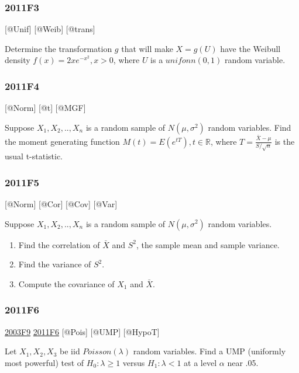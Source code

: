 \documentclass[6pt,Portrait]{article}
\begin{document}
\hypertarget{f3-4}{%
\subsubsection{2011F3}\label{f3-4}}

{[}@Unif{]} {[}@Weib{]} {[}@trans{]}

Determine the transformation \(g\) that will make \(X=g(U)\) have the
Weibull density \(f(x)=2xe^{-x^2},x>0\), where \(U\) is a
\(unifonn(0,1)\) random variable.

\hypertarget{f4-4}{%
\subsubsection{2011F4}\label{f4-4}}

{[}@Norm{]} {[}@t{]} {[}@MGF{]}

Suppose \(X_1,X_2,..,X_{n}\) is a random sample of \(N(\mu,\sigma^2)\)
random variables. Find the moment generating function
\(M(t)=E(e^{tT}),t\in\mathbb R\), where
\(T=\frac{\bar X-\mu}{S/\sqrt{n}}\) is the usual t-statistic.

\hypertarget{f5-4}{%
\subsubsection{2011F5}\label{f5-4}}

{[}@Norm{]} {[}@Cor{]} {[}@Cov{]} {[}@Var{]}

Suppose \(X_1,X_2,..,X_{n}\) is a random sample of \(N(\mu,\sigma^2)\)
random variables.

\begin{enumerate}
\def\labelenumi{(\alph{enumi})}
\item
  Find the correlation of \(\bar X\) and \(S^2\), the sample mean and
  sample variance.
\item
  Find the variance of \(S^2\).
\item
  Compute the covariance of \(X_1\) and \(\bar X\).
\end{enumerate}

\hypertarget{f6-4}{%
\subsubsection{2011F6}\label{f6-4}}

\protect\hyperlink{f9-1}{2003F9} \protect\hyperlink{f6-4}{2011F6}
{[}@Pois{]} {[}@UMP{]} {[}@HypoT{]}

Let \(X_1,X_2,X_3\) be iid \(Poisson(\lambda)\) random variables. Find a
UMP (uniformly most powerful) test of \(H_0:\lambda\ge1\) versus
\(H_1:\lambda<1\) at a level \(\alpha\) near .05.
\end{document}
